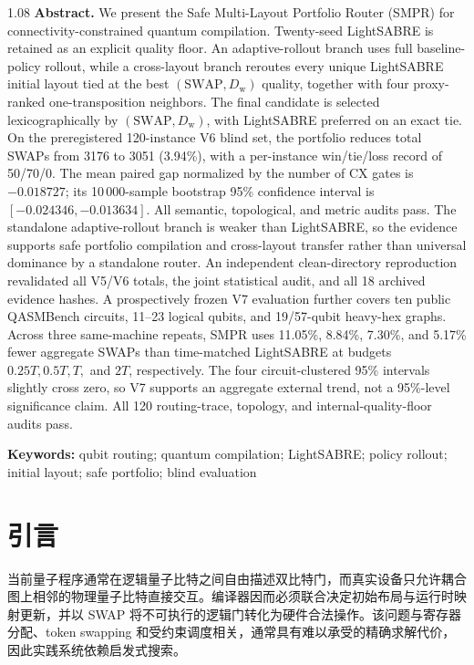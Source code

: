 \documentclass[11pt,a4paper]{article}
\begin{document}
\begin{notebox}[title={English abstract}]
\begin{spacing}{1.08}
\footnotesize
\textbf{Abstract.}
We present the Safe Multi-Layout Portfolio Router (SMPR) for
connectivity-constrained quantum compilation.  Twenty-seed LightSABRE is
retained as an explicit quality floor.  An adaptive-rollout branch uses full
baseline-policy rollout, while a cross-layout branch reroutes every
unique LightSABRE initial layout tied at the best $(\mathrm{SWAP},D_{\mathrm w})$
quality, together with four proxy-ranked one-transposition neighbors.  The
final candidate is selected lexicographically by $(\mathrm{SWAP},D_{\mathrm w})$,
with LightSABRE preferred on an exact tie.  On the preregistered 120-instance
V6 blind set, the portfolio reduces total SWAPs from 3176 to 3051 (3.94\%),
with a per-instance win/tie/loss record of 50/70/0.  The mean paired gap
normalized by the number of CX gates is $-0.018727$; its 10\,000-sample
bootstrap 95\% confidence interval is $[-0.024346,-0.013634]$.  All semantic,
topological, and metric audits pass.  The standalone adaptive-rollout branch
is weaker than LightSABRE, so the evidence supports safe portfolio compilation and
cross-layout transfer rather than universal dominance by a standalone router.
An independent clean-directory reproduction revalidated all V5/V6 totals,
the joint statistical audit, and all 18 archived evidence hashes.  A
prospectively frozen V7 evaluation further covers ten public QASMBench
circuits, 11--23 logical qubits, and 19/57-qubit heavy-hex graphs.  Across
three same-machine repeats, SMPR uses 11.05\%, 8.84\%, 7.30\%, and 5.17\%
fewer aggregate SWAPs than time-matched LightSABRE at budgets
$0.25T,0.5T,T,$ and $2T$, respectively.  The four circuit-clustered 95\%
intervals slightly cross zero, so V7 supports an aggregate external trend,
not a 95\%-level significance claim.  All 120 routing-trace, topology, and
internal-quality-floor audits pass.

\noindent\textbf{Keywords:} qubit routing; quantum compilation; LightSABRE;
policy rollout; initial layout; safe portfolio; blind evaluation
\end{spacing}
\end{notebox}

\section{引言}

当前量子程序通常在逻辑量子比特之间自由描述双比特门，而真实设备只允许耦合图上相邻的物理量子比特直接交互。编译器因而必须联合决定初始布局与运行时映射更新，并以 SWAP 将不可执行的逻辑门转化为硬件合法操作。该问题与寄存器分配、token swapping 和受约束调度相关，通常具有难以承受的精确求解代价，因此实践系统依赖启发式搜索\citep{Siraichi2018QubitAllocation,Zulehner2018Mapping,Cowtan2019Routing}。
\end{document}
